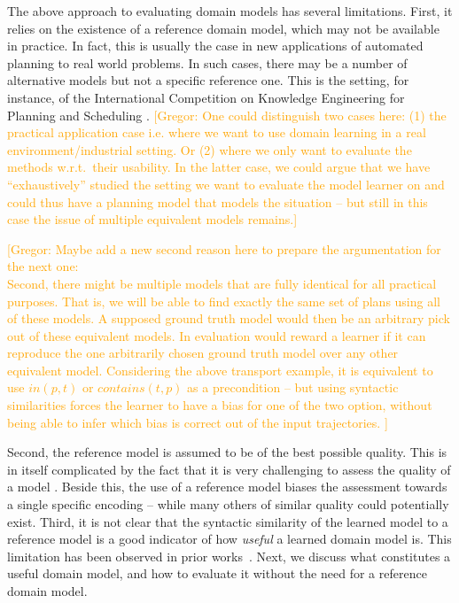 \documentclass{article}
\theoremstyle{definition}
\theoremstyle{remark}
\newcommand{\roni}[1]{{\textcolor{red}{[Roni: #1]}}}
\newcommand{\gregor}[1]{{\textcolor{orange}{[Gregor: #1]}}}
\begin{document}
The above approach to evaluating domain models has several limitations. 
First, it relies on the existence of a reference domain model, which may not be available in practice. 
In fact, this is usually the case in new applications of automated planning to real world problems. In such cases, there may be a number of alternative models but not a specific reference one. This is the setting, for instance, of the International Competition on Knowledge Engineering for Planning and Scheduling \citep{DBLP:journals/aim/ChrpaMVV17}.
\gregor{One could distinguish two cases here: (1) the practical application case i.e. where we want to use domain learning in a real environment/industrial setting. Or (2) where we only want to evaluate the methods w.r.t.\ their usability. In the latter case, we could argue that we have ``exhaustively'' studied the setting we want to evaluate the model learner on and could thus have a planning model that models the situation -- but still in this case the issue of multiple equivalent models remains.}


\gregor{Maybe add a new second reason here to prepare the argumentation for the next one:\\
Second, there might be multiple models that are fully identical for all practical purposes.
That is, we will be able to find exactly the same set of plans using all of these models.
A supposed ground truth model would then be an arbitrary pick out of these equivalent models.
In evaluation would reward a learner if it can reproduce the one arbitrarily chosen ground truth model over any other equivalent model.
Considering the above transport example, it is equivalent to use $in(p,t)$ or $contains(t,p)$ as a precondition -- but using syntactic similarities forces the learner to have a bias for one of the two option, without being able to infer which bias is correct out of the input trajectories.
}

Second, the reference model is assumed to be of the best possible quality. This is in itself complicated by the fact that it is very challenging to assess the quality of a model \citep{DBLP:conf/kcap/McCluskeyVV17}. Beside this, the use of a reference model biases the assessment towards a single specific encoding -- while many others of similar quality could potentially exist.
Third, it is not clear that the syntactic similarity of the learned model to a reference model is a good indicator of how \emph{useful} a learned domain model is. This limitation has been observed in prior works~\citep{aineto2019learning,juba2021safe,mordoch2024safe}.
Next, we discuss what constitutes a useful domain model, and how to evaluate it without the need for a reference domain model.
\end{document}
